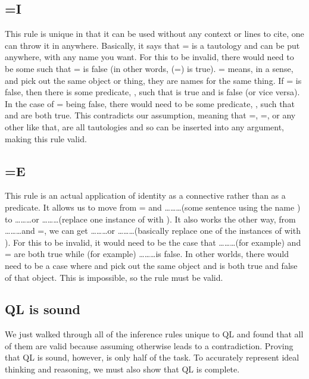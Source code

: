 \subsection{=I}
This rule is unique in that it can be used without any context or lines to cite, one can throw it in anywhere. Basically, it says that = is a tautology and can be put anywhere, with any name you want. For this to be invalid, there would need to be some  such that = is false (in other words, \enot(=) is true). = means, in a sense,  and  pick out the same object or thing, they are names for the same thing. If = is false, then there is some predicate, , such that  is true and  is false (or vice versa). In the case of = being false, there would need to be some predicate, , such that  and \enot{} are both true. This contradicts our assumption, meaning that =, =, or any other like that, are all tautologies and so can be inserted into any argument, making this rule valid. 

\subsection{=E}
This rule is an actual application of identity as a connective rather than as a predicate. It allows us to move from = and \ldots {}\ldots{}\ldots (some sentence using the name ) to \ldots {}\ldots{}\ldots or \ldots {}\ldots{}\ldots (replace one instance of  with ). It also works the other way, from \ldots {}\ldots{}\ldots and =, we can get \ldots {}\ldots{}\ldots or \ldots {}\ldots{}\ldots (basically replace one of the instances of  with ). For this to be invalid, it would need to be the case that \ldots {}\ldots{}\ldots (for example) and =  are both true while (for example)  \ldots {}\ldots{}\ldots is false. In other worlds, there would need to be a case where  and  pick out the same object and  is both true and false of that object. This is impossible, so the rule must be valid. 

\subsection{QL is sound}
We just walked through all of the inference rules unique to QL and found that all of them are valid because assuming otherwise leads to a contradiction. Proving that QL is sound, however, is only half of the task. To accurately represent ideal thinking and reasoning, we must also show that QL is complete. 

